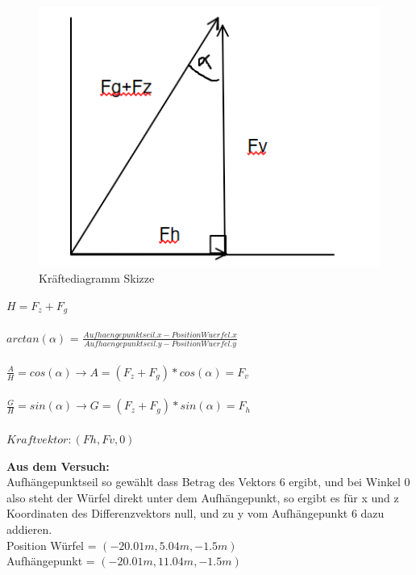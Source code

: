 \documentclass[../main.tex]{subfiles}
\begin{document}
     \begin{figure}[H]
               \begin{center}
                   \centerline{\includegraphics[width=155mm]{./images/Lab3Unity/KraefteDiagramm.png}}
                   \caption{Kräftediagramm Skizze}
                   \label{fig:KräfteDiagramm}
               \end{center}
     \end{figure}
\begin{mdframed}
$H = F_z +F_g$\\\\
$arctan(\alpha)$ = $\frac{Aufhaengepunktseil.x-Position Wuerfel.x }{Aufhaengepunktseil.y-Position Wuerfel.y }$\\\\
$\frac{A}{H}= cos(\alpha) \rightarrow A = (F_z + F_g) * cos(\alpha)= F_v$\\\\
$\frac{G}{H}= sin(\alpha) \rightarrow G = (F_z + F_g) * sin(\alpha)= F_h$\\\\
$Kraftvektor: (Fh,Fv,0)$
\end{mdframed}
\textbf {Aus dem Versuch:\\}
Aufhängepunktseil so gewählt dass Betrag des Vektors 6 ergibt, und bei Winkel 0 also steht der Würfel direkt unter dem Aufhängepunkt, so ergibt es für x und z Koordinaten des Differenzvektors null, und zu y vom Aufhängepunkt 6 dazu addieren.\\
Position Würfel = $(-20.01m,5.04m,-1.5m)$\\
Aufhängepunkt = $(-20.01m,11.04m,-1.5m)$\\
\end{document}
